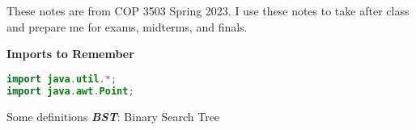 These notes are from COP 3503 Spring 2023. I use these notes to take after class and prepare me for exams, midterms, and finals.

\begin{note}\textbf{Imports to Remember}{}
    \begin{lstlisting}[language=Java]
import java.util.*;
import java.awt.Point;
    \end{lstlisting}
\end{note}

\begin{definition}{Some definitions}{}
    \textbf{\emph{BST}}: Binary Search Tree
\end{definition}